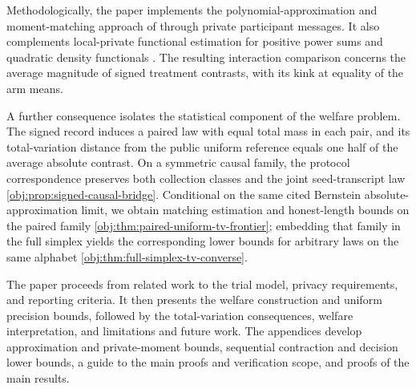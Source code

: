 Methodologically, the paper implements the polynomial-approximation and moment-matching approach of \citet[Theorem~1 and Sections~3--5]{CaiLow2011Nonsmooth} through private participant messages. It also complements local-private functional estimation for positive power sums \citep[Theorems~2.4--2.7]{ButuceaIssartel2021Functionals} and quadratic density functionals \citep[Theorems~3.2--3.3 and~4.1--4.2]{ButuceaRohdeSteinberger2023Quadratic}. The resulting interaction comparison concerns the average magnitude of signed treatment contrasts, with its kink at equality of the arm means.

A further consequence isolates the statistical component of the welfare problem. The signed record induces a paired law with equal total mass in each pair, and its total-variation distance from the public uniform reference equals one half of the average absolute contrast. On a symmetric causal family, the protocol correspondence preserves both collection classes and the joint seed-transcript law \cref{obj:prop:signed-causal-bridge}. Conditional on the same cited Bernstein absolute-approximation limit, we obtain matching estimation and honest-length bounds on the paired family \cref{obj:thm:paired-uniform-tv-frontier}; embedding that family in the full simplex yields the corresponding lower bounds for arbitrary laws on the same alphabet \cref{obj:thm:full-simplex-tv-converse}.



The paper proceeds from related work to the trial model, privacy requirements, and reporting criteria. It then presents the welfare construction and uniform precision bounds, followed by the total-variation consequences, welfare interpretation, and limitations and future work. The appendices develop approximation and private-moment bounds, sequential contraction and decision lower bounds, a guide to the main proofs and verification scope, and proofs of the main results.
